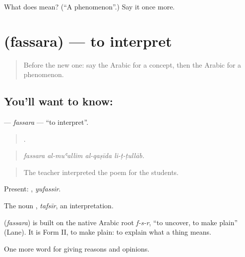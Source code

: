 \begin{tcolorbox}[breakable,colback=teal!4,colframe=teal!35!black,title={Before you move on}]
What does  mean? (\textquotedblleft{}A phenomenon\textquotedblright{}.) Say it once more.
\end{tcolorbox}
\section[\texorpdfstring{\ar{فسر} (fassara)}{فسر (fassara)}]{ (fassara) — to interpret}

\label{lesson:AR-C363-fassara}



\begin{quote}
Before the new one: say the Arabic for a concept, then the Arabic for a phenomenon.
\end{quote}

\subsection*{You'll want to know: }
\textbf{} — \emph{fassara} — \textquotedblleft{}to interpret\textquotedblright{}.

\begin{quote}
   .
\end{quote}

\begin{quote}
\emph{fassara al-muʿallim al-qaṣīda li-ṭ-ṭullāb.}
\end{quote}

\begin{quote}
The teacher interpreted the poem for the students.
\end{quote}

Present: , \emph{yufassir}.

The noun , \emph{tafsīr}, an interpretation.

\begin{cousinweb}
\textbf{} (\emph{fassara}) is built on the native Arabic root \emph{f-s-r}, \textquotedblleft{}to uncover, to make plain\textquotedblright{} (Lane). It is Form II, to make plain: to explain what a thing means.
\end{cousinweb}

\begin{grammarlens}[title={What you've built}]
One more word for giving reasons and opinions.
\end{grammarlens}

